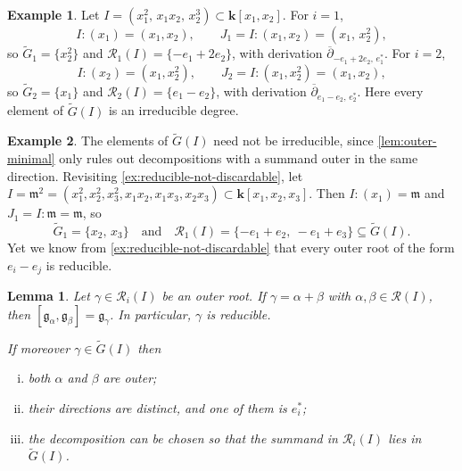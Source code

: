 \documentclass[11pt,letterpaper,reqno]{amsart}
\newtheorem{lemma}[lemma]{Lemma}
\theoremstyle{remark}
\theoremstyle{definition}
\newtheorem{example}[example]{Example}
\def\M{\mathfrak{m}}
\newcommand{\KK}[0]{\ensuremath{\mathbf{k}}}
\newcommand{\R}{\mathcal R}
\begin{document}
\begin{example}\label{ex:outer-colon}
Let $I=(x_1^2,\,x_1x_2,\,x_2^3)\subset\KK[x_1,x_2]$. For $i=1$,
$$
I:(x_1)=(x_1,x_2),\qquad J_1=I:(x_1,x_2)=(x_1,\,x_2^2),
$$
so $\widetilde G_1=\{x_2^2\}$ and $\mathcal R_1(I)=\{-e_1+2e_2\}$, with
derivation $\overline\partial_{-e_1+2e_2,\,e_1^*}$. For
$i=2$,
$$
I:(x_2)=(x_1,x_2^2),\qquad J_2=I:(x_1,x_2^2)=(x_1,x_2),
$$
so $\widetilde G_2=\{x_1\}$ and $\mathcal R_2(I)=\{e_1-e_2\}$, with
derivation $\overline\partial_{e_1-e_2,\,e_2^*}$. Here every
element of $\widetilde G(I)$ is an irreducible degree.
\end{example}

\begin{example}\label{ex:m2-outer-outer}
The elements of $\widetilde G(I)$ need not be irreducible, since
\cref{lem:outer-minimal} only rules out decompositions with a summand outer
in the same direction. Revisiting \cref{ex:reducible-not-discardable}, let $I=\M^2=(x_1^2,x_2^2,x_3^2,x_1x_2,x_1x_3,x_2x_3)
\subset\KK[x_1,x_2,x_3]$. Then $I:(x_1)=\M$ and
$J_1=I:\M=\M$, so
$$
\widetilde G_1=\{x_2,\,x_3\}\quad \text{and}\quad 
\mathcal R_1(I)=\{-e_1+e_2,\ -e_1+e_3\}\subseteq \widetilde G(I).
$$
Yet we know from \cref{ex:reducible-not-discardable} that every outer root of the form $e_i-e_j$ is reducible.
\end{example}

\begin{lemma}\label{lem:outer-reducible}
Let $\gamma\in\R_i(I)$ be an outer root. If $\gamma = \alpha + \beta$ with
$\alpha, \beta \in \mathcal R(I)$, then $[\mathfrak g_{\alpha},\mathfrak g_\beta]=\mathfrak g_{\gamma}$. In particular, $\gamma$ is reducible.

If moreover $\gamma\in\widetilde G(I)$ then
\begin{enumerate}[(i)]
\item both $\alpha$ and $\beta$ are outer;
\item their directions are distinct, and one of them is $e_i^*$;
\item the decomposition can be chosen so that the summand in $\R_i(I)$ lies in $\widetilde G(I)$.
\end{enumerate}
\end{lemma}
\end{document}
